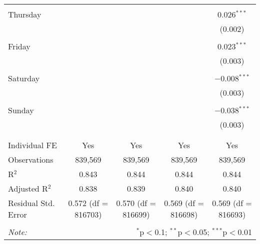 \documentclass[
]{article}
\begin{document}
\begin{table}[!htbp]
{\begin{tabular}{@{\extracolsep{5pt}}lcccc}
  & & & & \\ 
 Thursday &  &  &  & 0.026$^{***}$ \\ 
  &  &  &  & (0.002) \\ 
  & & & & \\ 
 Friday &  &  &  & 0.023$^{***}$ \\ 
  &  &  &  & (0.003) \\ 
  & & & & \\ 
 Saturday &  &  &  & $-$0.008$^{***}$ \\ 
  &  &  &  & (0.003) \\ 
  & & & & \\ 
 Sunday &  &  &  & $-$0.038$^{***}$ \\ 
  &  &  &  & (0.003) \\ 
  & & & & \\ 
\hline \\[-1.8ex] 
Individual FE & Yes & Yes & Yes & Yes \\ 
Observations & 839,569 & 839,569 & 839,569 & 839,569 \\ 
R$^{2}$ & 0.843 & 0.844 & 0.844 & 0.844 \\ 
Adjusted R$^{2}$ & 0.838 & 0.839 & 0.840 & 0.840 \\ 
Residual Std. Error & 0.572 (df = 816703) & 0.570 (df = 816699) & 0.569 (df = 816698) & 0.569 (df = 816693) \\ 
\hline 
\hline \\[-1.8ex] 
\textit{Note:}  & \multicolumn{4}{r}{$^{*}$p$<$0.1; $^{**}$p$<$0.05; $^{***}$p$<$0.01} \\ 
\end{tabular}
} 
\end{table} 
\newpage
\end{document}
